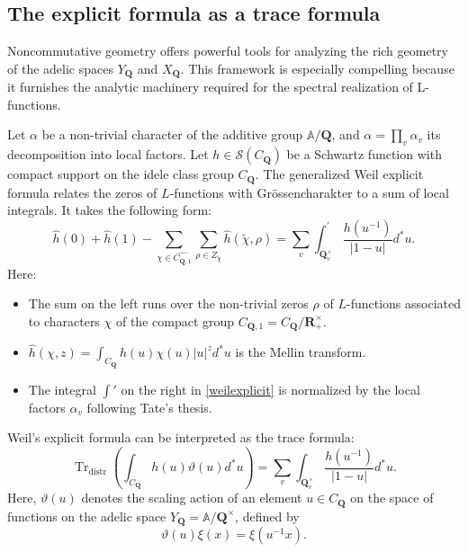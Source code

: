 \documentclass[11pt,a4paper]{article}
\newcommand{\Q}{\mathbf{Q}}
\newcommand{\R}{\mathbf{R}}
\newcommand{\A}{\mathbb{A}}
\theoremstyle{plain}
\theoremstyle{definition} %
\begin{document}
\subsection{The explicit formula as a trace formula}\label{sect8.1}
Noncommutative geometry offers powerful tools for analyzing the rich geometry of the adelic spaces $Y_{\mathbf{Q}}$ and $X_{\mathbf{Q}}$. This framework is especially compelling because it furnishes the analytic machinery required for the spectral realization of L-functions.

Let $\alpha$ be a non-trivial character of the additive group $\A / \Q$, and  $\alpha = \prod_v \alpha_v$ its decomposition into local factors. Let $h \in \mathcal{S}(C_\Q)$ be a Schwartz function with compact support  on the idele class group $C_\Q$.
The generalized Weil explicit formula relates the zeros of $L$-functions with Grössencharakter to a sum of local integrals. It takes the following form:
\begin{equation}\label{weilexplicit}
\hat{h}(0) + \hat{h}(1) - \sum_{\chi \in \widehat{C_{\Q, 1}}} \sum_{\rho \in Z_{\tilde{\chi}}} \hat{h}(\tilde{\chi}, \rho) = \sum_v \int_{\Q_v^\times}^{\prime} \frac{h(u^{-1})}{|1-u|} d^* u.
\end{equation}
Here:
\begin{itemize}
    \item The sum on the left runs over the non-trivial zeros $\rho$ of $L$-functions associated to characters $\chi$ of the compact group $C_{\Q, 1} = C_\Q / \R_+^\times$.
    \item $\hat{h}(\chi, z) = \int_{C_\Q} h(u) \chi(u) |u|^z d^*u$ is the Mellin transform.
    \item The integral $\int'$ on the right in \eqref{weilexplicit} is normalized by the local factors $\alpha_v$ following Tate's thesis.
\end{itemize}

Weil's explicit formula can be interpreted as the trace formula:
\[
\operatorname{Tr}_{\text{distr}} \left( \int_{C_\Q} h(u) \vartheta(u) d^*u \right) = \sum_v \int_{\Q_v^\times} \frac{h(u^{-1})}{|1-u|} d^* u.
\]
Here, $\vartheta(u)$ denotes the scaling action of an element $u \in C_\Q$ on the space of functions on the adelic space $Y_\Q = \A / \Q^\times$, defined by $$\vartheta(u) \xi(x) = \xi(u^{-1} x).$$
\end{document}
